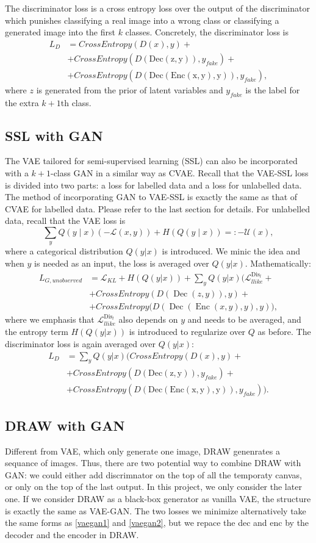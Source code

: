 \documentclass[10pt]{article}
\newcommand{\op}[1]{\operatorname{#1}}
\begin{document}
The discriminator loss is a cross entropy loss over the output of the discriminator which punishes classifying a real image into a wrong class or classifying a generated image into the first $k$ classes. Concretely, the discriminator loss is
\begin{align}
L_D &= CrossEntropy(D(x),y) +\\
&+ CrossEntropy(D(\op{Dec(z,y)}),y_{fake}) + \\
&+CrossEntropy(D(\op{Dec(Enc(x,y),y)}),y_{fake}),
\end{align}
where $z$ is generated from the prior of latent variables and $y_{fake}$ is the label for the extra $k+1$th class. 
\subsection{SSL with GAN}
The VAE tailored for semi-supervised learning (SSL) can also be incorporated with a $k+1$-class GAN in a similar way as CVAE. Recall that the VAE-SSL loss is divided into two parts: a loss for labelled data and a loss for unlabelled data. The method of incorporating GAN to VAE-SSL is exactly the same as that of CVAE for labelled data. Please refer to the last section for details. For unlabelled data, recall that the VAE loss is 
$$
\sum_y Q(y \mid x) (-\mathcal{L}(x,y)) + H(Q(y \mid x)) =: -\mathcal{U}(x),
$$
where a categorical distribution $Q(y|x)$ is introduced. We minic the idea and when $y$ is needed as an input, the loss is averaged over $Q(y|x)$. Mathematically:
\begin{align}
L_{G,unobserved} &= \mathcal{L}_{KL} + H(Q(y|x))+\sum_y Q(y|x)\big(\mathcal{L}_{llike}^{\op{Dis}_l}+ \\
&+CrossEntropy(D(\op{Dec}(z,y)),y)+ \\
&+CrossEntropy(D(\op{Dec}(\op{Enc}(x,y),y),y)\big),
\end{align}
where we emphasis that $\mathcal{L}_{llike}^{\op{Dis}_l}$ also depends on $y$ and needs to be averaged, and the entropy term $H(Q(y|x))$ is introduced to regularize over $Q$ as before.
The discriminator loss is again averaged over $Q(y|x)$: 
\begin{align}
L_D &= \sum_y Q(y|x)\big(CrossEntropy(D(x),y) +\\
&+ CrossEntropy(D(\op{Dec(z,y)}),y_{fake}) + \\
&+CrossEntropy(D(\op{Dec(Enc(x,y),y)}),y_{fake})\big).
\end{align}
\subsection{DRAW with GAN}
Different from VAE, which only generate one image, DRAW genenrates a sequance of images. Thus, there are two potential way to combine DRAW with GAN: we could either add discrimnator on the top of all the temporaty canvas, or only on the top of the last output. In this project, we only consider the later one. If we consider DRAW as a black-box generator as vanilla VAE, the structure is exactly the same as VAE-GAN. The two losses we minimize alternatively take the same forms as \ref{vaegan1} and \ref{vaegan2}, but we repace the dec and enc by the decoder and the encoder in DRAW. 
\end{document}
